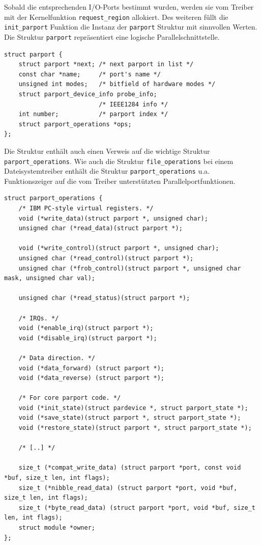 \documentclass[a4paper,11pt]{article}
\begin{document}
Sobald die entsprechenden I/O-Ports bestimmt wurden, werden sie vom Treiber mit der Kernelfunktion \verb|request_region| allokiert.
Des weiteren füllt die \verb|init_parport| Funktion die Instanz der \verb|parport| Struktur mit sinnvollen Werten.
Die Struktur \verb|parport| repräsentiert eine logische Parallelschnittstelle.

\begin{verbatim}
struct parport {
    struct parport *next; /* next parport in list */
    const char *name;     /* port's name */
    unsigned int modes;   /* bitfield of hardware modes */
    struct parport_device_info probe_info;
                          /* IEEE1284 info */
    int number;           /* parport index */
    struct parport_operations *ops;
};\end{verbatim}

Die Struktur enthält auch einen Verweis auf die wichtige Struktur \verb|parport_operations|.
Wie auch die Struktur \verb|file_operations| bei einem Dateisystemtreiber enthält die 
Struktur \verb|parport_operations| u.a. Funktionszeiger auf die vom Treiber unterstützten
Parallelportfunktionen.

\begin{verbatim}
struct parport_operations {
    /* IBM PC-style virtual registers. */
    void (*write_data)(struct parport *, unsigned char);
    unsigned char (*read_data)(struct parport *);

    void (*write_control)(struct parport *, unsigned char);
    unsigned char (*read_control)(struct parport *);
    unsigned char (*frob_control)(struct parport *, unsigned char mask, unsigned char val);

    unsigned char (*read_status)(struct parport *);

    /* IRQs. */
    void (*enable_irq)(struct parport *);
    void (*disable_irq)(struct parport *);

    /* Data direction. */
    void (*data_forward) (struct parport *);
    void (*data_reverse) (struct parport *);

    /* For core parport code. */
    void (*init_state)(struct pardevice *, struct parport_state *);
    void (*save_state)(struct parport *, struct parport_state *);
    void (*restore_state)(struct parport *, struct parport_state *);

    /* [..] */

    size_t (*compat_write_data) (struct parport *port, const void *buf, size_t len, int flags);
    size_t (*nibble_read_data) (struct parport *port, void *buf, size_t len, int flags);
    size_t (*byte_read_data) (struct parport *port, void *buf, size_t len, int flags);
    struct module *owner;
};\end{verbatim}
\end{document}
